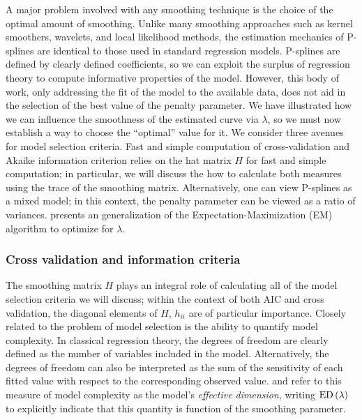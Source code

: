 \documentclass[12pt]{article}
\theoremstyle{definition}
\begin{document}
A major problem involved with any smoothing technique is the choice of the optimal amount of smoothing. Unlike many smoothing approaches such as kernel smoothers, wavelets, and local likelihood methods, the estimation mechanics of P-splines are identical to those used in standard regression models. P-splines are defined by clearly defined coefficients, so we can exploit the surplus of regression theory to compute informative properties of the model. However, this body of work, only addressing the fit of the model to the available data, does not aid in the selection of the best value of the penalty parameter.  We have illustrated how we can influence the smoothness of the estimated curve via $\lambda$, so we must now establish a way to choose the ``optimal'' value for it.  We consider three avenues for model selection criteria. Fast and simple computation of cross-validation and Akaike information criterion relies on the hat matrix $H$ for fast and simple computation; in particular, we will discuss the how to calculate both measures using the trace of the smoothing matrix. Alternatively, one can view P-splines as a mixed model; in this context, the penalty parameter can be viewed as a ratio of variances. \cite{marx2010p} presents an generalization of the Expectation-Maximization (EM) algorithm to optimize for $\lambda$.


\subsubsection{Cross validation and information criteria}

The smoothing matrix $H$ plays an integral role of calculating all of the model selection criteria we will discuss; within the context of both AIC and cross validation, the diagonal elements of $H$, $h_{ii}$ are of particular importance. Closely related to the problem of model selection is the ability to quantify model complexity. In classical regression theory, the degrees of freedom are clearly defined as the number of variables included in the model. Alternatively, the degrees of freedom can also be interpreted as the sum of the sensitivity of each fitted value with respect to the corresponding observed value. \cite{eilers1996flexible} and\cite{marx2005multidimensional} refer to this measure of model complexity as the model's \emph{effective dimension}, writing $\textup{ED}\left(\lambda\right)$ to explicitly indicate that this quantity is function of the smoothing parameter. 
\end{document}
